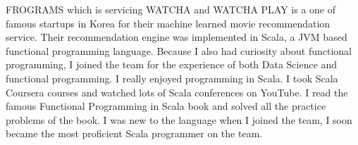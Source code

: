 \documentclass[11pt]{article}
\begin{document}
FROGRAMS which is servicing WATCHA and WATCHA PLAY is a one of famous startups in Korea for their machine learned movie recommendation service.
Their recommendation engine was implemented in Scala, a JVM based functional programming language.
Because I also had curiosity about functional programming, I joined the team for the experience of both Data Science and functional programming.
I really enjoyed programming in Scala.
I took Scala Coursera courses and watched lots of Scala conferences on YouTube.
I read the famous Functional Programming in Scala book and solved all the practice problems of the book.
I was new to the language when I joined the team, I soon became the most proficient Scala programmer on the team.
\end{document}
